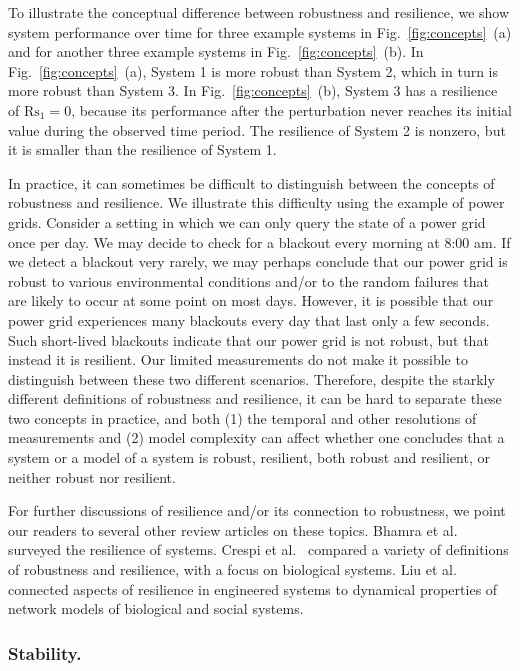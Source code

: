 \documentclass{comnet-mod}
\begin{document}
To illustrate the conceptual difference between robustness and resilience, we show system performance over time for three example systems in Fig.~\ref{fig:concepts}~(a) and for another three example systems in Fig.~\ref{fig:concepts}~(b). In Fig.~\ref{fig:concepts}~(a), System 1 is more robust than System 2, which in turn is more robust than System 3. In Fig.~\ref{fig:concepts}~(b), System 3 has a resilience of $\textrm{Rs}_1 = 0$, because its performance after the perturbation never reaches its initial value during the observed time period. The resilience of System 2 is nonzero, but it is smaller than the resilience of System 1. 

In practice, it can sometimes be difficult to distinguish between the concepts of robustness and resilience. We illustrate this difficulty using the example of power grids. Consider a setting in which we can only query the state of a power grid once per day. We may decide to check for a blackout every morning at 8:00 am. If we detect a blackout very rarely, we may perhaps conclude that our power grid is robust to various environmental conditions and/or to the random failures that are likely to occur at some point on most days. However, it is possible that our power grid experiences many blackouts every day that last only a few seconds. Such short-lived blackouts indicate that our power grid is not robust, but that instead it is resilient. Our limited measurements do not make it possible to distinguish between these two different scenarios. Therefore, despite the starkly different definitions of robustness and resilience, it can be hard to separate these two concepts in practice, and both (1) the temporal and other resolutions of measurements and (2) model complexity can affect whether one concludes that a system or a model of a system is robust, resilient, both robust and resilient, or neither robust nor resilient. 



For further discussions of resilience and/or its connection to robustness, we point our readers to several other review articles on these topics. Bhamra et al.~\cite{Bhamra2011} surveyed the resilience of systems. Crespi et al.~\cite{Crespi2021} compared a variety of definitions of robustness and resilience, with a focus on biological systems. Liu et al.~\cite{Liu2022} connected aspects of resilience in engineered systems to dynamical properties of network models of biological and social systems.


\subsubsection{Stability.}
\end{document}
